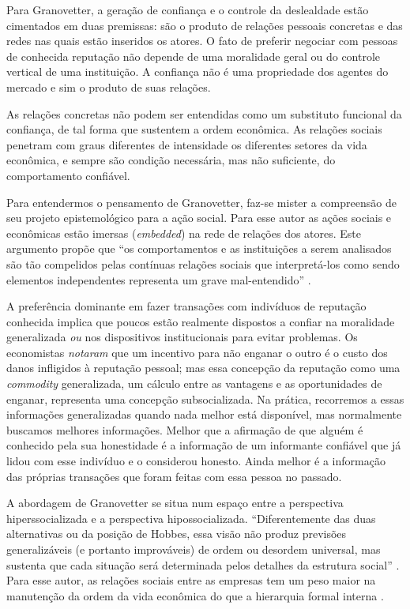 \documentclass[a4paper, 12pt, openright, oneside, german, french, english, brazil]{abntex2}
\begin{document}
	Para Granovetter, a geração de confiança e o controle da deslealdade estão cimentados em duas premissas: são o produto de relações pessoais concretas e das redes nas quais estão inseridos os atores. O fato de preferir negociar com pessoas de conhecida reputação não depende de uma moralidade geral ou do controle vertical de uma instituição. A confiança não é uma propriedade dos agentes do mercado e sim o produto de suas relações.
	
	As relações concretas não podem ser entendidas como um substituto funcional da confiança, de tal forma que sustentem a ordem econômica. As relações sociais penetram com graus diferentes de intensidade os diferentes setores da vida econômica, e sempre são condição necessária, mas não suficiente, do comportamento confiável.
	
	Para entendermos o pensamento de Granovetter, faz-se mister a compreensão de seu projeto epistemológico para a ação social. Para esse autor as ações sociais e econômicas estão imersas (\textit{embedded}) na rede de relações dos atores. Este argumento propõe que ``os comportamentos e as instituições a serem analisados são tão compelidos pelas contínuas relações sociais que interpretá-los como sendo elementos independentes representa um grave mal-entendido'' \cite[p. 3]{granovetter2007acao}.
	
	\begin{citacao}
		A preferência dominante em fazer transações com indivíduos de reputação conhecida implica que poucos estão realmente dispostos a confiar na moralidade generalizada \textit{ou} nos dispositivos institucionais para evitar problemas. Os economistas \textit{notaram} que um incentivo para não enganar o outro é o custo dos danos infligidos à reputação pessoal; mas essa concepção da reputação como uma \textit{commodity} generalizada, um cálculo entre as vantagens e as oportunidades de enganar, representa uma concepção subsocializada. Na prática, recorremos a essas informações generalizadas quando nada melhor está disponível, mas normalmente buscamos melhores informações. Melhor que a afirmação de que alguém é conhecido pela sua honestidade é a informação de um informante confiável que já lidou com esse indivíduo e o considerou honesto. Ainda melhor é a informação das próprias transações que foram feitas com essa pessoa no passado. \cite[p. 12]{granovetter2007acao}
	\end{citacao}
	
	A abordagem de Granovetter se situa num espaço entre a perspectiva hiperssocializada e a perspectiva hipossocializada. ``Diferentemente das duas alternativas ou da posição de Hobbes, essa visão não produz previsões generalizáveis (e portanto improváveis) de ordem ou desordem universal, mas sustenta que cada situação será determinada pelos detalhes da estrutura social'' \cite[p. 15]{granovetter2007acao}. Para esse autor, as relações sociais entre as empresas tem um peso maior na manutenção da ordem da vida econômica do que a hierarquia formal interna \cite{granovetter2007acao}.
	
\end{document}
